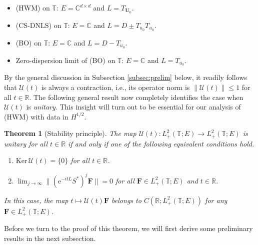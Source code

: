 \documentclass[10pt,reqno,a4paper]{amsart}
\newtheorem{thm}{Theorem}[section]
\theoremstyle{definition}
\theoremstyle{remark}
\theoremstyle{remark}
\numberwithin{equation}{section}
\newcommand{\C}{\mathbb{C}}
\newcommand{\R}{\mathbb{R}}
\newcommand{\T}{\mathbb{T}}
\renewcommand{\ker}{\mathrm{Ker}}
\newcommand{\eu}{\mathrm{e}}
\newcommand{\Ub}{\mathbf{U}}
\newcommand{\Fb}{\mathbf{F}}
\newcommand{\Us}{\mathscr{U}}
\begin{document}
\begin{itemize}
\item (HWM) on $\T$: $E=\C^{d \times d}$ and $L=T_{\Ub_0}$.
\item (CS-DNLS) on $\T$: $E= \C$ and $L=D \pm T_{u_0} T_{u_0}$.
\item (BO) on $\T$: $E= \C$ and $L=D - T_{u_0}$. 
\item Zero-dispersion limit of (BO) on $\T$: $E=\C$ and $L=T_{u_0}$.
\end{itemize}

By the general discussion in Subsection \ref{subsec:prelim} below, it readily follows that $\Us(t)$ is always a contraction, i.e., its operator norm is $\| \Us(t) \| \leq 1$ for all $t\in \R$. The following general result now completely identifies the case when $\Us(t)$ is {\em unitary}. This insight will turn out to be essential for our analysis of (HWM) with data in $H^{1/2}$.
\begin{thm}[Stability principle] \label{thm:stony}
The map $\Us(t) : L^2_+(\T;E) \to L^2_+(\T;E)$ is unitary for all $t \in \R$ if and only if one of the following equivalent conditions hold.
\begin{enumerate}
\item[(i)] $\ker \, \Us(t) = \{ 0 \}$ for all $t \in \R$.
\item[(ii)] $\displaystyle \lim_{j \to \infty} \| (\eu^{-it L} S^*)^j \Fb \| = 0$ for all $\Fb \in L^2_+(\T;E)$ and $t \in \R$.
\end{enumerate}
In this case, the map $t \mapsto \Us(t) \Fb$ belongs to $C(\R; L^2_+(\T;E))$ for any $\Fb \in L^2_+(\T;E)$.
\end{thm}

Before we turn to the proof of this theorem, we will first derive some preliminary results in the next subsection.
\end{document}
